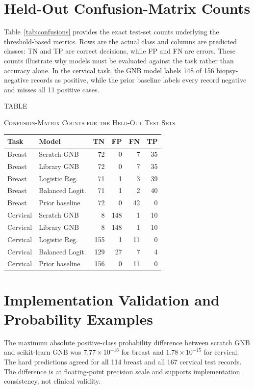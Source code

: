 \documentclass[conference]{IEEEtran}
\begin{document}
\appendices
\section{Held-Out Confusion-Matrix Counts}
Table~\ref{tab:confusions} provides the exact test-set counts underlying the threshold-based metrics. Rows are the actual class and columns are predicted classes: TN and TP are correct decisions, while FP and FN are errors. These counts illustrate why models must be evaluated against the task rather than accuracy alone. In the cervical task, the GNB model labels 148 of 156 biopsy-negative records as positive, while the prior baseline labels every record negative and misses all 11 positive cases.

\begin{center}
\label{tab:confusions}
{\footnotesize TABLE \thetable\par}
{\footnotesize\textsc{Confusion-Matrix Counts for the Held-Out Test Sets}\par}
\vspace{2pt}
\scriptsize
\setlength{\tabcolsep}{3pt}
\begin{tabular}{p{1.05cm}p{2.05cm}rrrr}
\toprule
Task & Model & TN & FP & FN & TP \\
\midrule
Breast & Scratch GNB & 72 & 0 & 7 & 35 \\
Breast & Library GNB & 72 & 0 & 7 & 35 \\
Breast & Logistic Reg. & 71 & 1 & 3 & 39 \\
Breast & Balanced Logit. & 71 & 1 & 2 & 40 \\
Breast & Prior baseline & 72 & 0 & 42 & 0 \\
Cervical & Scratch GNB & 8 & 148 & 1 & 10 \\
Cervical & Library GNB & 8 & 148 & 1 & 10 \\
Cervical & Logistic Reg. & 155 & 1 & 11 & 0 \\
Cervical & Balanced Logit. & 129 & 27 & 7 & 4 \\
Cervical & Prior baseline & 156 & 0 & 11 & 0 \\
\bottomrule
\end{tabular}
\end{center}

\section{Implementation Validation and Probability Examples}
The maximum absolute positive-class probability difference between scratch GNB and scikit-learn GNB was $7.77\times10^{-16}$ for breast and $1.78\times10^{-15}$ for cervical. The hard predictions agreed for all 114 breast and all 167 cervical test records. The difference is at floating-point precision scale and supports implementation consistency, not clinical validity.
\end{document}
